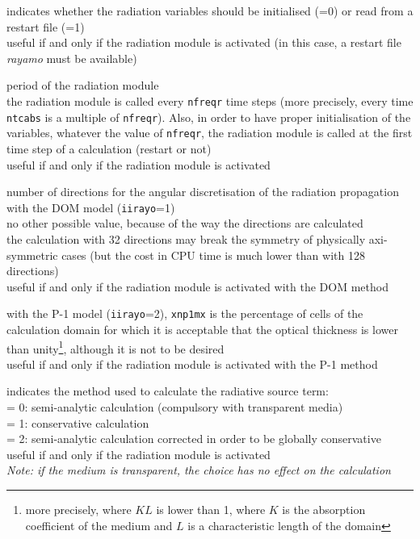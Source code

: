 {indicates whether the radiation variables should be initialised (=0) or read
from a restart file (=1)\\
useful if and only if the radiation module is activated (in this case, a
restart file {\em rayamo} must be available)}

{period of the radiation module\\
the radiation module is called every {\tt nfreqr} time steps (more precisely,
every time {\tt ntcabs} is a multiple of {\tt nfreqr}). Also, in order to
have proper initialisation of the variables, whatever the value of {\tt nfreqr},
the radiation module is called at the first time step of a calculation
(restart or not)\\
useful if and only if the radiation module is activated}

{number of directions for the angular discretisation of the radiation
propagation with the DOM model ({\tt iirayo}=1)\\
no other possible value, because of the way the directions are calculated\\
the calculation with 32 directions may break the symmetry of
physically axi-symmetric cases (but the cost in CPU time is much lower
 than with 128 directions)\\
useful if and only if the radiation module is activated with the DOM method}

{with the P-1 model ({\tt iirayo}=2), {\tt xnp1mx} is the percentage of cells of
the calculation domain for which it is acceptable that the optical
thickness is lower than unity\footnote{more precisely, where $KL$ is lower than
1, where $K$ is the absorption coefficient of the medium and $L$ is a
characteristic length of the domain}, although it is not to be desired\\
useful if and only if the radiation module is activated with the P-1 method}

{indicates the method used to calculate the radiative source term:\\
\hspace*{1.3cm}= 0: semi-analytic calculation (compulsory with transparent
media)\\
\hspace*{1.3cm}= 1: conservative calculation\\
\hspace*{1.3cm}= 2: semi-analytic calculation corrected in order to be
globally conservative\\
useful if and only if the radiation module is activated\\
{\em Note: if the medium is transparent, the choice has no effect on the calculation}}

